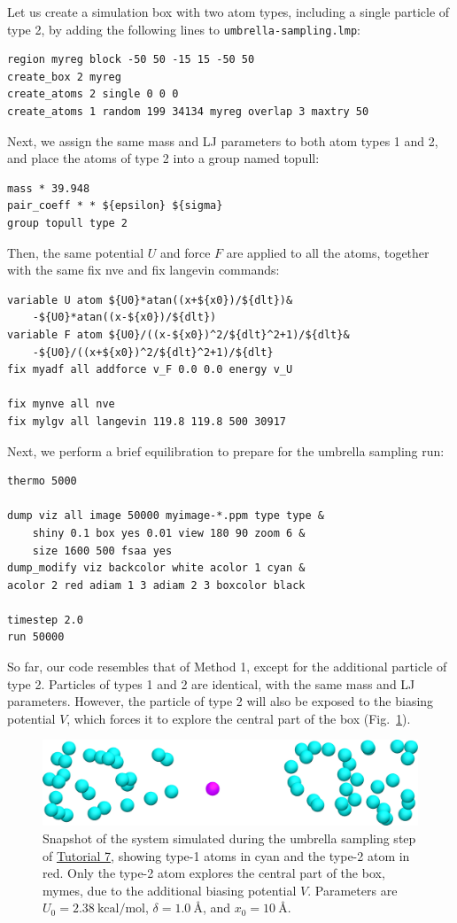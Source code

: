 \documentclass[9pt,tutorial]{livecoms}
\newcommand{\lmpcmd}[1]{\colorbox{listing}{\textcolor{command}{\small{#1}}}} %
\newcommand{\flecmd}[1]{\textcolor{command}{\texttt{#1}}} %
\begin{document}
Let us create a simulation box with two atom types, including a single particle of type 2,
by adding the following lines to \flecmd{umbrella-sampling.lmp}:
\begin{lstlisting}
region myreg block -50 50 -15 15 -50 50
create_box 2 myreg
create_atoms 2 single 0 0 0
create_atoms 1 random 199 34134 myreg overlap 3 maxtry 50
\end{lstlisting}
Next, we assign the same mass and LJ parameters to both atom types
1 and 2, and place the atoms of type 2 into a group named \lmpcmd{topull}:
\begin{lstlisting}
mass * 39.948
pair_coeff * * ${epsilon} ${sigma}
group topull type 2
\end{lstlisting}
Then, the same potential $U$ and force $F$ are applied to all the atoms,
together with the same \lmpcmd{fix nve} and \lmpcmd{fix langevin} commands:
\begin{lstlisting}
variable U atom ${U0}*atan((x+${x0})/${dlt})&
    -${U0}*atan((x-${x0})/${dlt})
variable F atom ${U0}/((x-${x0})^2/${dlt}^2+1)/${dlt}&
    -${U0}/((x+${x0})^2/${dlt}^2+1)/${dlt}
fix myadf all addforce v_F 0.0 0.0 energy v_U

fix mynve all nve
fix mylgv all langevin 119.8 119.8 500 30917
\end{lstlisting}
Next, we perform a brief equilibration to prepare for the
umbrella sampling run:
\begin{lstlisting}
thermo 5000

dump viz all image 50000 myimage-*.ppm type type &
    shiny 0.1 box yes 0.01 view 180 90 zoom 6 &
    size 1600 500 fsaa yes
dump_modify viz backcolor white acolor 1 cyan &
acolor 2 red adiam 1 3 adiam 2 3 boxcolor black

timestep 2.0
run 50000
\end{lstlisting}

So far, our code resembles that of Method 1, except for the additional particle
of type 2.  Particles of types 1 and 2 are identical, with the same mass
and LJ parameters.  However, the particle of type 2 will also
be exposed to the biasing potential $V$, which forces it to explore the
central part of the box (Fig.~\ref{fig:US-system-biased}).

\begin{figure}
\centering
\includegraphics[width=\linewidth]{US-system-biased}
\caption{Snapshot of the system simulated during the umbrella sampling
step of \hyperref[umbrella-sampling-label]{Tutorial 7}, showing type-1 atoms
in cyan and the type-2 atom in red.  Only the type-2 atom explores the central part of the box,
\lmpcmd{mymes}, due to the additional biasing potential $V$. {\color{blue}Parameters} are
$U_0 = 2.38~\text{kcal/mol}$, $\delta = 1.0~\text{\AA{}}$, and $x_0 = 10~\text{\AA{}}$.}
\label{fig:US-system-biased}
\end{figure}
\end{document}

